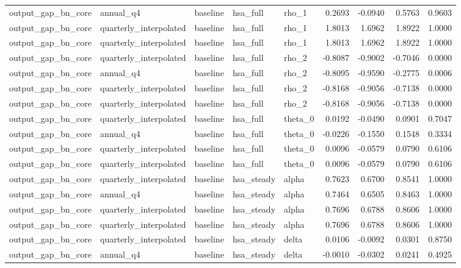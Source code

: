 \begin{tabular}{lllllrrrr}
output\_gap\_bn\_core & annual\_q4 & baseline & hsa\_full & rho\_1 & 0.2693 & -0.0940 & 0.5763 & 0.9603 \\
output\_gap\_bn\_core & quarterly\_interpolated & baseline & hsa\_full & rho\_1 & 1.8013 & 1.6962 & 1.8922 & 1.0000 \\
output\_gap\_bn\_core & quarterly\_interpolated & baseline & hsa\_full & rho\_1 & 1.8013 & 1.6962 & 1.8922 & 1.0000 \\
output\_gap\_bn\_core & quarterly\_interpolated & baseline & hsa\_full & rho\_2 & -0.8087 & -0.9002 & -0.7046 & 0.0000 \\
output\_gap\_bn\_core & annual\_q4 & baseline & hsa\_full & rho\_2 & -0.8095 & -0.9590 & -0.2775 & 0.0006 \\
output\_gap\_bn\_core & quarterly\_interpolated & baseline & hsa\_full & rho\_2 & -0.8168 & -0.9056 & -0.7138 & 0.0000 \\
output\_gap\_bn\_core & quarterly\_interpolated & baseline & hsa\_full & rho\_2 & -0.8168 & -0.9056 & -0.7138 & 0.0000 \\
output\_gap\_bn\_core & quarterly\_interpolated & baseline & hsa\_full & theta\_0 & 0.0192 & -0.0490 & 0.0901 & 0.7047 \\
output\_gap\_bn\_core & annual\_q4 & baseline & hsa\_full & theta\_0 & -0.0226 & -0.1550 & 0.1548 & 0.3334 \\
output\_gap\_bn\_core & quarterly\_interpolated & baseline & hsa\_full & theta\_0 & 0.0096 & -0.0579 & 0.0790 & 0.6106 \\
output\_gap\_bn\_core & quarterly\_interpolated & baseline & hsa\_full & theta\_0 & 0.0096 & -0.0579 & 0.0790 & 0.6106 \\
output\_gap\_bn\_core & quarterly\_interpolated & baseline & hsa\_steady & alpha & 0.7623 & 0.6700 & 0.8541 & 1.0000 \\
output\_gap\_bn\_core & annual\_q4 & baseline & hsa\_steady & alpha & 0.7464 & 0.6505 & 0.8463 & 1.0000 \\
output\_gap\_bn\_core & quarterly\_interpolated & baseline & hsa\_steady & alpha & 0.7696 & 0.6788 & 0.8606 & 1.0000 \\
output\_gap\_bn\_core & quarterly\_interpolated & baseline & hsa\_steady & alpha & 0.7696 & 0.6788 & 0.8606 & 1.0000 \\
output\_gap\_bn\_core & quarterly\_interpolated & baseline & hsa\_steady & delta & 0.0106 & -0.0092 & 0.0301 & 0.8750 \\
output\_gap\_bn\_core & annual\_q4 & baseline & hsa\_steady & delta & -0.0010 & -0.0302 & 0.0241 & 0.4925 \\

\end{tabular}
